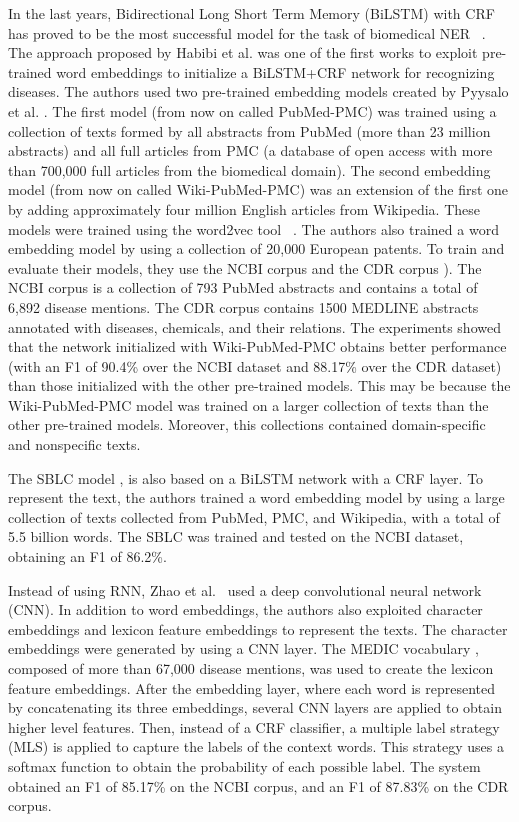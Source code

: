 \documentclass[preprint,12pt]{elsarticle}
\begin{document}
In the last years, Bidirectional Long Short Term Memory (BiLSTM) \cite{hochreiter1997long} with CRF has proved to be the most successful model for the task of biomedical NER~ \cite{lyu2017long,habibi2017deep,cho2019biomedical}. The approach proposed by Habibi et al.  \cite{habibi2017deep} was one of the first works to exploit pre-trained word embeddings to initialize a BiLSTM+CRF network for recognizing diseases. The authors used two pre-trained embedding models created by Pyysalo et al.  \cite{pyysalo2013dis}. The first model (from now on called PubMed-PMC) was trained using a collection of texts formed by all abstracts from PubMed (more than 23 million abstracts) and  all full articles from PMC (a database of open access with more than 700,000 full articles from the biomedical domain). The second embedding model (from now on called Wiki-PubMed-PMC) was an extension of the first one by adding approximately four million English articles from Wikipedia. These models were trained using the word2vec tool~ \cite{mikolov2013distributed}. The authors also trained a word embedding model by using a collection of 20,000 European patents. To train and evaluate their models, they use the NCBI corpus \cite{dougan2014ncbi} and the CDR corpus \cite{li2016biocreative}). 
The NCBI corpus is a collection of 793 PubMed abstracts and contains a total of 6,892 disease mentions. The CDR corpus contains 1500 MEDLINE abstracts annotated with diseases, chemicals, and their relations. The experiments showed that the network initialized with Wiki-PubMed-PMC obtains better performance (with an F1 of 90.4\% over the NCBI dataset and 88.17\% over the CDR dataset) than those initialized with the other pre-trained models. This may be because the Wiki-PubMed-PMC model was trained on a larger collection of texts than the other  pre-trained models. Moreover, this collections contained domain-specific and nonspecific texts. 

The SBLC model \cite{xu2018sblc}, is also based on a  BiLSTM network with a CRF layer. To represent the text, the authors trained a word embedding model by using a large collection of texts collected from PubMed, PMC,  and Wikipedia, with a total of  5.5 billion words. The SBLC was trained and tested on the NCBI dataset, obtaining an F1 of 86.2\%.

Instead of using RNN, Zhao et al.~ \cite{zhao2017disease} used a deep convolutional neural network (CNN). In addition to word embeddings, the authors also exploited character embeddings and lexicon feature embeddings to represent the texts. The character embeddings were generated by using a CNN layer. The MEDIC vocabulary  \cite{davis2012medic}, composed of more than 67,000 disease mentions, was used to create the lexicon feature embeddings. After the embedding layer, where each word is represented by concatenating its three embeddings, several CNN layers are applied to obtain higher level features. Then, instead of a CRF classifier, a multiple label strategy (MLS) is applied to capture the labels of the context words. This strategy uses a softmax function to obtain the probability of each possible label. The system obtained an F1 of 85.17\% on the NCBI corpus, and an F1 of 87.83\% on the CDR corpus. 
\end{document}
